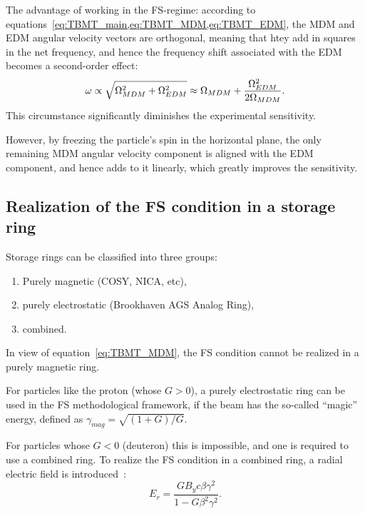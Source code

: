 The advantage of working in the FS-regime:
according to equations~\cref{eq:TBMT_main,eq:TBMT_MDM,eq:TBMT_EDM}, the MDM and EDM
angular velocity vectors are orthogonal, meaning that htey add in squares in the net frequency,
and hence the frequency shift associated with the EDM becomes a second-order effect:~\cite[p.~5]{Mane:SpinWheel}
\[
\omega \propto \sqrt{\Omega_{MDM}^2 + \Omega_{EDM}^2} \approx \Omega_{MDM} + \frac{\Omega_{EDM}^2}{2\Omega_{MDM}}.
\]
This circumstance significantly diminishes the experimental sensitivity.

However, by freezing the particle's spin in the horizontal plane, the only remaining
MDM angular velocity component is aligned with the EDM component, and hence adds to it
linearly, which greatly improves the sensitivity.

\subsection{Realization of the FS condition in a storage ring}\label{sec:FS_in_a_ring}
Storage rings can be classified into three groups:
\begin{enumerate}
	\item Purely magnetic (COSY, NICA, etc),
	\item purely electrostatic (Brookhaven AGS Analog Ring),
	\item combined.
\end{enumerate}

In view of equation~\eqref{eq:TBMT_MDM}, the FS condition cannot be realized in a purely magnetic ring.

For particles like the proton (whose $G>0$), a purely electrostatic ring can
be used in the FS methodological framework, if the beam has the so-called ``magic''
energy, defined as $\gamma_{mag} = \sqrt{(1+G)/G}$.

For particles whose $G<0$ (deuteron) this is impossible, and one is required to use a combined ring.
To realize the FS condition in a combined ring, a radial electric field is introduced~\cite{BNL:Deuteron2008}:
\begin{equation}\label{eq:FS_Er}
E_r = \frac{GB_yc\beta\gamma^2}{1-G\beta^2\gamma^2}.
\end{equation}
